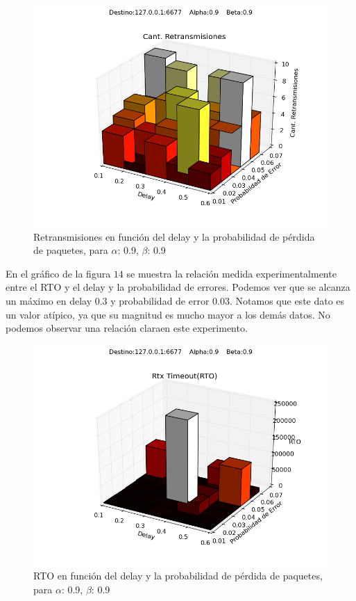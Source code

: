 \begin{figure}[H]
  \centering	
	\includegraphics[scale=0.5]{../analisis/graficos_tablas/graficos_en_funcion_de_delay_probaerror/0.9-0.9/retransmisiones.png}
  \caption{Retransmisiones en funci\'on del delay y la probabilidad de pérdida de paquetes, para $\alpha$: 0.9, $\beta$: 0.9}
	\label{fig:histo-src-sitiotrabajo}
\end{figure}

En el gráfico de la figura $14$ se muestra la relación medida experimentalmente entre el RTO y el delay y la probabilidad de errores. Podemos ver que se alcanza un máximo en delay $0.3$ y probabilidad de error $0.03$. Notamos que este dato es un valor atípico, ya que su magnitud es mucho mayor a los demás datos. No podemos observar una relación claraen este experimento.

\begin{figure}[H]
  \centering	
	\includegraphics[scale=0.5]{../analisis/graficos_tablas/graficos_en_funcion_de_delay_probaerror/0.9-0.9/rto.png}
  \caption{RTO en función del delay y la probabilidad de pérdida de paquetes, para $\alpha$: 0.9, $\beta$: 0.9}
	\label{fig:histo-src-sitiotrabajo}
\end{figure}

